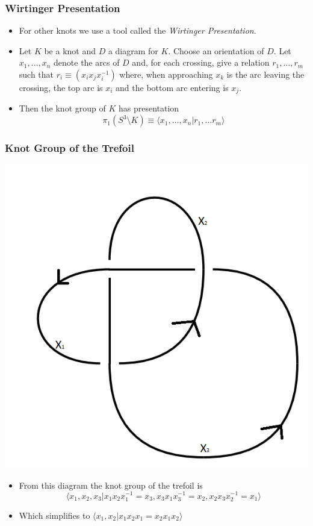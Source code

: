 \documentclass{beamer}
\begin{document}
\begin{frame}
  \frametitle{Wirtinger Presentation}
  \begin{itemize}
  \item For other knots we use a tool called the \textit{Wirtinger Presentation}.
    \pause
  \item Let $K$ be a knot and $D$ a diagram for $K$. Choose an orientation of $D$.
    Let $x_1,\ldots, x_n$ denote the arcs of $D$ and, for each crossing, give a
    relation $r_1,\ldots, r_m$ such that $r_i\equiv (x_i x_j x_i^{-1})$ where, when approaching
    $x_k$ is the arc leaving the crossing, the top arc is $x_i$ and the bottom arc entering
    is $x_j$.
    \pause
  \item Then the knot group of $K$ has presentation
    \[
      \pi_1(S^3\setminus K) \equiv \langle x_1,\ldots, x_n| r_1,\ldots r_m\rangle
    \]
  \end{itemize}
\end{frame}

\begin{frame}
  \frametitle{Knot Group of the Trefoil}
  \begin{center}
    \includegraphics[scale=.25]{annotated-trefoil}
  \end{center}
  \begin{itemize}
  \item From this diagram the knot group of the trefoil is 
    \[
      \langle x_1,x_2,x_3|x_1x_2x_1^{-1}=x_3,x_3x_1x_3^{-1}=x_2,x_2x_3x_2^{-1}=x_1\rangle
    \]\pause
  \item Which simplifies to $\langle x_1,x_2|x_1 x_2 x_1= x_2 x_1 x_2\rangle$
  \end{itemize}
\end{frame}
\end{document}
